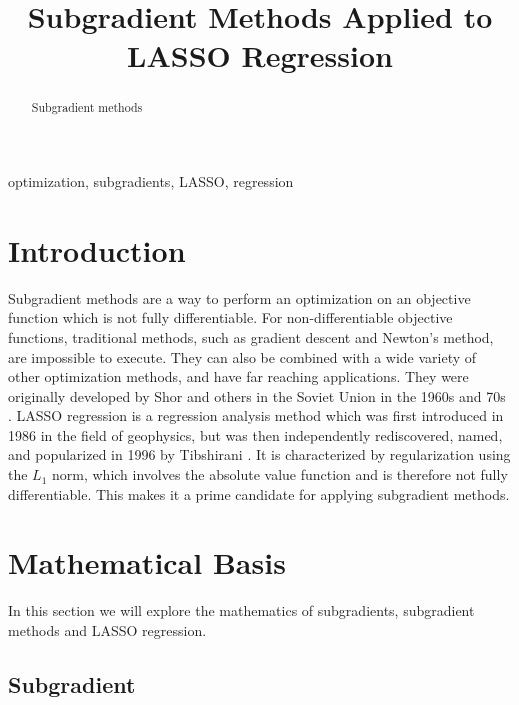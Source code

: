 \documentclass[conference]{IEEEtran}
\begin{document}
\title{
Subgradient Methods Applied to LASSO Regression
}

\author{
}


\maketitle

\begin{abstract}
Subgradient methods
\end{abstract}

\begin{IEEEkeywords}
optimization, subgradients, LASSO, regression
\end{IEEEkeywords}

\section{Introduction}\label{sec:intro}
Subgradient methods are a way to perform an optimization on an objective function which is not fully differentiable. For non-differentiable objective functions, traditional methods, such as gradient descent and Newton's method, are impossible to execute. They can also be combined with a wide variety of other optimization methods, and have far reaching applications. They were originally developed by Shor and others in the Soviet Union in the 1960s and 70s \cite{boydparksubgradients} \cite{boydxiaosubgradients}. LASSO regression is a regression analysis method which was first introduced in 1986 \cite{lassooriginal} in the field of geophysics, but was then independently rediscovered, named, and popularized in 1996 by Tibshirani \cite{lassopaper}. It is characterized by regularization using the \(L_1\) norm, which involves the absolute value function and is therefore not fully differentiable. This makes it a prime candidate for applying subgradient methods.


\section{Mathematical Basis}\label{sec:math}
In this section we will explore the mathematics of subgradients, subgradient methods and LASSO regression.
\subsection{Subgradient}\label{sec:math subgrad}
\end{document}

